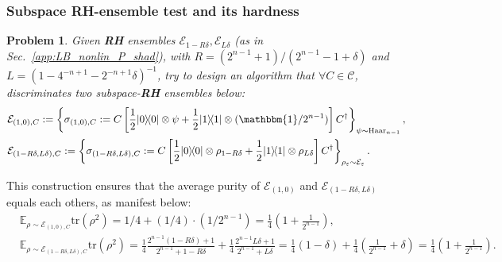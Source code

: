 \documentclass[aps,%
twocolumn,%
floatfix,%
pra,%
amsfonts,%
groupedaddress,%
superscriptaddress]{revtex4-2}%
\newtheorem{problem}{Problem}
\newcommand{\bra}[1]{\langle #1\rvert}
\newcommand{\ket}[1]{\lvert #1\rangle}
\newcommand{\1}{\mathbbm{1}}
\begin{document}
\subsubsection{Subspace \textbf{RH}-ensemble test and its hardness}
\begin{problem}\label{prob:RHtest}
    Given \textbf{RH} ensembles $\mathcal{E}_{1 - R\delta}, \mathcal{E}_{L\delta}$ (as in Sec.~\ref{app:LB_nonlin_P_shad}), with $R = (2^{n-1} + 1)/(2^{n-1} - 1 +\delta)$ and $L = (1 - 4^{-n+1} - 2^{-n+1} \delta)^{-1}$, try to design an algorithm that $\forall C \in \mathcal{C}$, discriminates two subspace-\textbf{RH} ensembles below:
    \begin{align}
        &\mathcal{E}_{(1,0),C} := \left\{\sigma_{(1,0),C}:= C \left[\frac{1}{2} \ket{0}\!\bra{0} \otimes \psi + \frac{1}{2} \ket{1}\!\bra{1} \otimes (\1/2^{n-1}) \right] C^{\dagger}\right\}_{\psi \sim \mathrm{Haar}_{n-1}},\\
        &\mathcal{E}_{(1 - R\delta,L\delta),C} := \left\{ \sigma_{(1 - R\delta,L\delta),C} :=C \left[\frac{1}{2} \ket{0}\!\bra{0} \otimes \rho_{1 - R\delta} + \frac{1}{2} \ket{1}\!\bra{1} \otimes \rho_{L\delta} \right] C^{\dagger}\right\}_{\rho_{\varepsilon} \sim \mathcal{E}_{\varepsilon}}.
    \end{align}
\end{problem}
This construction ensures that the average purity of $\mathcal{E}_{(1,0)}$ and $\mathcal{E}_{(1 - R\delta,L\delta)} $ equals each others, as manifest below:
\begin{align}
    &\mathbb{E}_{\rho \sim \mathcal{E}_{(1,0),C}} \mathrm{tr}\left(\rho^{2}\right) = 1/4 +  (1/4) \cdot (1/2^{n-1}) =  \frac{1}{4}\left(1+\frac{1}{2^{n-1}}\right), \\
    &\mathbb{E}_{\rho \sim \mathcal{E}_{(1 - R\delta,L\delta),C}} \mathrm{tr}\left(\rho^{2}\right) = \frac{1}{4}\frac{2^{n-1}(1 - R\delta) + 1}{2^{n-1} + 1 - R\delta} + \frac{1}{4}\frac{2^{n-1} L\delta + 1}{2^{n-1} + L\delta} = \frac{1}{4}(1 - \delta) + \frac{1}{4}(\frac{1}{2^{n-1}} + \delta) = \frac{1}{4}\left(1+\frac{1}{2^{n-1}}\right).
\end{align}
\end{document}
